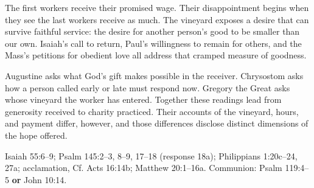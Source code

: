 The first workers receive their promised wage. Their disappointment begins when they see the last workers receive as much. The vineyard exposes a desire that can survive faithful service: the desire for another person's good to be smaller than our own. Isaiah's call to return, Paul's willingness to remain for others, and the Mass's petitions for obedient love all address that cramped measure of goodness.

Augustine asks what God's gift makes possible in the receiver. Chrysostom asks how a person called early or late must respond now. Gregory the Great asks whose vineyard the worker has entered. Together these readings lead from generosity received to charity practiced. Their accounts of the vineyard, hours, and payment differ, however, and those differences disclose distinct dimensions of the hope offered.

\smallskip
{\small\noindent Isaiah 55:6--9; Psalm 145:2--3, 8--9, 17--18 (response 18a); Philippians 1:20c--24, 27a; acclamation, Cf. Acts 16:14b; Matthew 20:1--16a. Communion: Psalm 119:4--5 \textbf{or} John 10:14.\par}
